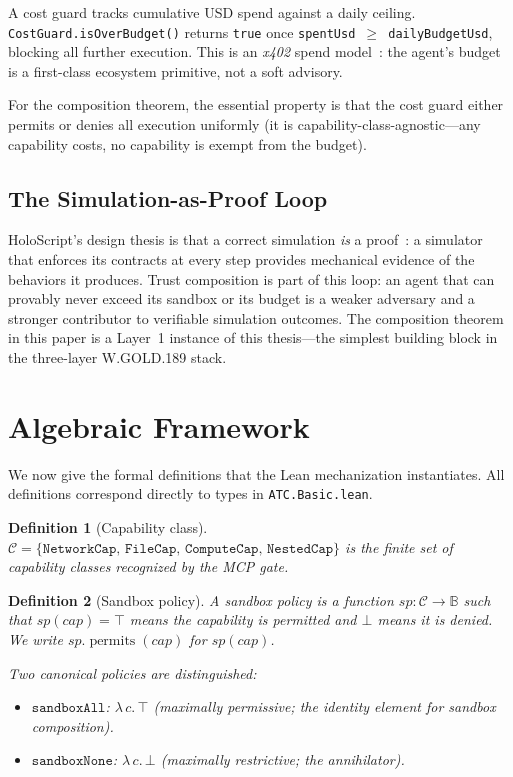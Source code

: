 \documentclass[sigconf]{acmart}
\newtheorem{definition}{Definition}
\newcommand{\permits}{\operatorname{permits}}
\newcommand{\SP}{\mathit{sp}}
\newcommand{\Bool}{\mathbb{B}}
\begin{document}
A cost guard tracks cumulative USD spend against a daily ceiling.
\texttt{CostGuard.isOverBudget()} returns \texttt{true} once
\texttt{spentUsd \(\geq\) dailyBudgetUsd}, blocking all further execution.
This is an \emph{x402} spend model~\cite{paper-3-crdt-ecoop2027}: the agent's
budget is a first-class ecosystem primitive, not a soft advisory.

For the composition theorem, the essential property is that the cost guard
either permits or denies all execution uniformly (it is capability-class-agnostic---any capability costs, no capability is exempt from the budget).

\subsection{The Simulation-as-Proof Loop}

HoloScript's design thesis is that a correct simulation \emph{is} a
proof~\cite{trust-by-construction}: a simulator that enforces its contracts at
every step provides mechanical evidence of the behaviors it produces.  Trust
composition is part of this loop: an agent that can provably never exceed its
sandbox or its budget is a weaker adversary and a stronger contributor to
verifiable simulation outcomes.  The composition theorem in this paper is a
Layer~1 instance of this thesis---the simplest building block in the
three-layer W.GOLD.189 stack.

\section{Algebraic Framework}
\label{sec:algebra}

We now give the formal definitions that the Lean mechanization instantiates.
All definitions correspond directly to types in \texttt{ATC.Basic.lean}.

\begin{definition}[Capability class]
\label{def:cap}
$\mathcal{C} = \{\texttt{NetworkCap},\,\texttt{FileCap},\,\texttt{ComputeCap},\,\texttt{NestedCap}\}$
is the finite set of capability classes recognized by the MCP gate.
\end{definition}

\begin{definition}[Sandbox policy]
\label{def:sandbox}
A \emph{sandbox policy} is a function $\SP : \mathcal{C} \to \Bool$ such that
$\SP(\mathit{cap}) = \top$ means the capability is permitted and $\bot$ means
it is denied.  We write $\SP.\permits(\mathit{cap})$ for $\SP(\mathit{cap})$.

Two canonical policies are distinguished:
\begin{itemize}
  \item $\mathtt{sandboxAll}$: $\lambda\,c.\,\top$ (maximally permissive; the
        identity element for sandbox composition).
  \item $\mathtt{sandboxNone}$: $\lambda\,c.\,\bot$ (maximally restrictive;
        the annihilator).
\end{itemize}
\end{definition}
\end{document}
